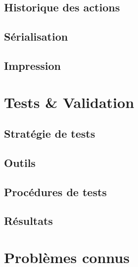 \documentclass[11pt,a4paper,oldfontcommands]{memoir}
\begin{document}
\section{Historique des actions}

\section{Sérialisation}

\section{Impression}


\chapter{Tests \& Validation}

\section{Stratégie de tests}

\section{Outils}

\section{Procédures de tests}

\section{Résultats}


\chapter{Problèmes connus}

\end{document}
